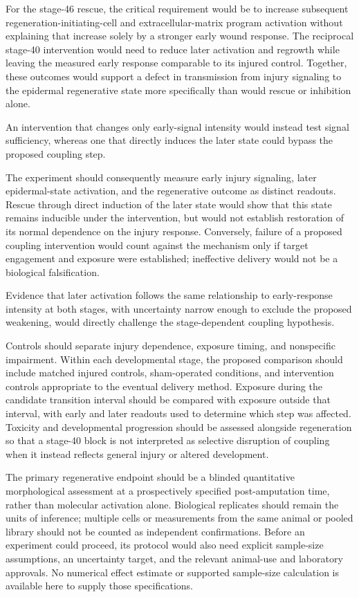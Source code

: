 \documentclass[11pt]{article}
\begin{document}
For the stage-46 rescue, the critical requirement would be to increase subsequent regeneration-initiating-cell and extracellular-matrix program activation without explaining that increase solely by a stronger early wound response. The reciprocal stage-40 intervention would need to reduce later activation and regrowth while leaving the measured early response comparable to its injured control. Together, these outcomes would support a defect in transmission from injury signaling to the epidermal regenerative state more specifically than would rescue or inhibition alone.

An intervention that changes only early-signal intensity would instead test signal sufficiency, whereas one that directly induces the later state could bypass the proposed coupling step.

The experiment should consequently measure early injury signaling, later epidermal-state activation, and the regenerative outcome as distinct readouts. Rescue through direct induction of the later state would show that this state remains inducible under the intervention, but would not establish restoration of its normal dependence on the injury response. Conversely, failure of a proposed coupling intervention would count against the mechanism only if target engagement and exposure were established; ineffective delivery would not be a biological falsification.

Evidence that later activation follows the same relationship to early-response intensity at both stages, with uncertainty narrow enough to exclude the proposed weakening, would directly challenge the stage-dependent coupling hypothesis.

Controls should separate injury dependence, exposure timing, and nonspecific impairment. Within each developmental stage, the proposed comparison should include matched injured controls, sham-operated conditions, and intervention controls appropriate to the eventual delivery method. Exposure during the candidate transition interval should be compared with exposure outside that interval, with early and later readouts used to determine which step was affected. Toxicity and developmental progression should be assessed alongside regeneration so that a stage-40 block is not interpreted as selective disruption of coupling when it instead reflects general injury or altered development.

The primary regenerative endpoint should be a blinded quantitative morphological assessment at a prospectively specified post-amputation time, rather than molecular activation alone. Biological replicates should remain the units of inference; multiple cells or measurements from the same animal or pooled library should not be counted as independent confirmations. Before an experiment could proceed, its protocol would also need explicit sample-size assumptions, an uncertainty target, and the relevant animal-use and laboratory approvals. No numerical effect estimate or supported sample-size calculation is available here to supply those specifications.
\end{document}
